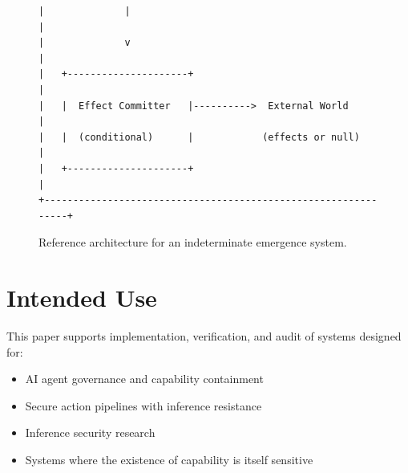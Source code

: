 \documentclass[11pt,a4paper]{article}
\begin{document}
\begin{figure}[h]
\begin{small}
\begin{verbatim}
|              |                                                 |
|              v                                                 |
|   +---------------------+                                      |
|   |  Effect Committer   |---------->  External World           |
|   |  (conditional)      |            (effects or null)         |
|   +---------------------+                                      |
+---------------------------------------------------------------+
\end{verbatim}
\end{small}
\caption{Reference architecture for an indeterminate emergence system.}
\label{fig:architecture}
\end{figure}

\section{Intended Use}

This paper supports implementation, verification, and audit of systems designed for:
\begin{itemize}
  \item AI agent governance and capability containment
  \item Secure action pipelines with inference resistance
  \item Inference security research
  \item Systems where the existence of capability is itself sensitive
\end{itemize}



\end{document}
